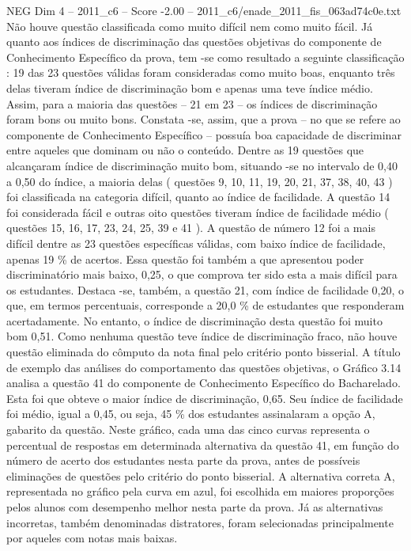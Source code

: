 \begin{textsample}{NEG Dim 4 – 2011\_c6 – Score -2.00 – 2011\_c6/enade\_2011\_fis\_063ad74c0e.txt}
Não houve questão classificada como muito difícil nem como muito fácil.
Já quanto aos índices de discriminação das questões objetivas do componente de Conhecimento Específico da prova, tem -se como resultado a seguinte classificação : 19 das 23 questões válidas foram consideradas como muito boas, enquanto três delas tiveram índice de discriminação bom e apenas uma teve índice médio.
Assim, para a maioria das questões – 21 em 23 – os índices de discriminação foram bons ou muito bons.
Constata -se, assim, que a prova – no que se refere ao componente de Conhecimento Específico – possuía boa capacidade de discriminar entre aqueles que dominam ou não o conteúdo.
Dentre as 19 questões que alcançaram índice de discriminação muito bom, situando -se no intervalo de 0,40 a 0,50 do índice, a maioria delas ( questões 9, 10, 11, 19, 20, 21, 37, 38, 40, 43 ) foi classificada na categoria difícil, quanto ao índice de facilidade.
A questão 14 foi considerada fácil e outras oito questões tiveram índice de facilidade médio ( questões 15, 16, 17, 23, 24, 25, 39 e 41 ).
A questão de número 12 foi a mais difícil dentre as 23 questões específicas válidas, com baixo índice de facilidade, apenas 19 \% de acertos.
Essa questão foi também a que apresentou poder discriminatório mais baixo, 0,25, o que comprova ter sido esta a mais difícil para os estudantes.
Destaca -se, também, a questão 21, com índice de facilidade 0,20, o que, em termos percentuais, corresponde a 20,0 \% de estudantes que responderam acertadamente.
No entanto, o índice de discriminação desta questão foi muito bom 0,51.
Como nenhuma questão teve índice de discriminação fraco, não houve questão eliminada do cômputo da nota final pelo critério ponto bisserial.
A título de exemplo das análises do comportamento das questões objetivas, o Gráfico 3.14 analisa a questão 41 do componente de Conhecimento Específico do Bacharelado.
Esta foi que obteve o maior índice de discriminação, 0,65.
Seu índice de facilidade foi médio, igual a 0,45, ou seja, 45 \% dos estudantes assinalaram a opção A, gabarito da questão.
Neste gráfico, cada uma das cinco curvas representa o percentual de respostas em determinada alternativa da questão 41, em função do número de acerto dos estudantes nesta parte da prova, antes de possíveis eliminações de questões pelo critério do ponto bisserial.
A alternativa correta A, representada no gráfico pela curva em azul, foi escolhida em maiores proporções pelos alunos com desempenho melhor nesta parte da prova.
Já as alternativas incorretas, também denominadas distratores, foram selecionadas principalmente por aqueles com notas mais baixas.

\end{textsample}

